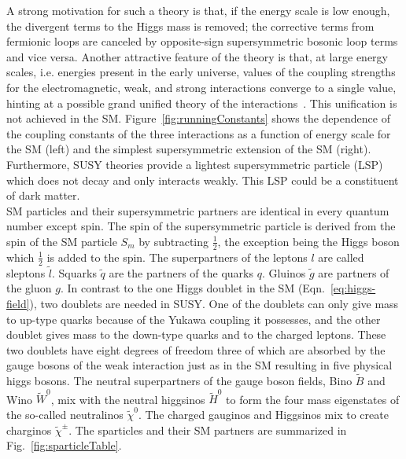 \indent A strong motivation for such a theory is that, if the energy scale is low enough, the 
divergent terms to the Higgs mass is removed; the corrective terms from fermionic loops are canceled by 
opposite-sign supersymmetric bosonic loop terms and vice versa. Another attractive feature
of the theory is that, at large energy scales, i.e. energies present in the early universe, 
values of the coupling strengths for the electromagnetic, weak, and strong interactions converge 
to a single value, hinting at a possible grand unified theory of the interactions~\cite{wess1992supersymmetry}. 
This unification is not achieved in the SM. Figure~\ref{fig:runningConstants} shows the 
dependence of the coupling constants of the three interactions as a function of energy scale 
for the SM (left) and the simplest supersymmetric extension of the SM (right). Furthermore,
SUSY theories provide a lightest supersymmetric particle (LSP) which does not decay and only 
interacts weakly. This LSP could be a constituent of dark matter.\\
\indent SM particles and their supersymmetric partners are identical in every quantum number except spin. 
The spin of the supersymmetric particle is derived from the spin of the SM particle $S_{m}$ by 
subtracting $\frac{1}{2}$, the exception being the Higgs boson which $\frac{1}{2}$ is added
to the spin. The superpartners of the leptons $l$ are called sleptons $\tilde{l}$. 
Squarks $\tilde{q}$ are the partners of the quarks $q$. Gluinos $\tilde{g}$ are partners
of the gluon $g$. In contrast to the one Higgs doublet in the SM (Eqn.~\ref{eq:higgs-field}), 
two doublets are needed in SUSY. One of the doublets can only give mass to up-type quarks because of
the Yukawa coupling it possesses, and the other doublet gives mass to the down-type 
quarks and to the charged leptons. These two doublets have eight degrees of
freedom three of which are absorbed by the gauge bosons of the weak interaction
just as in the SM resulting in five physical higgs bosons.
The neutral superpartners of the gauge boson fields, Bino $\widetilde{B}$ and Wino $\widetilde{W}^0$, mix
with the neutral higgsinos $\widetilde{H}^0$ to form the four mass eigenstates of the so-called neutralinos 
$\widetilde{\chi}^0$. The charged gauginos and Higgsinos mix to create charginos $\widetilde{\chi}^{\pm}$.
The sparticles and their SM partners are summarized in Fig.~\ref{fig:sparticleTable}.

